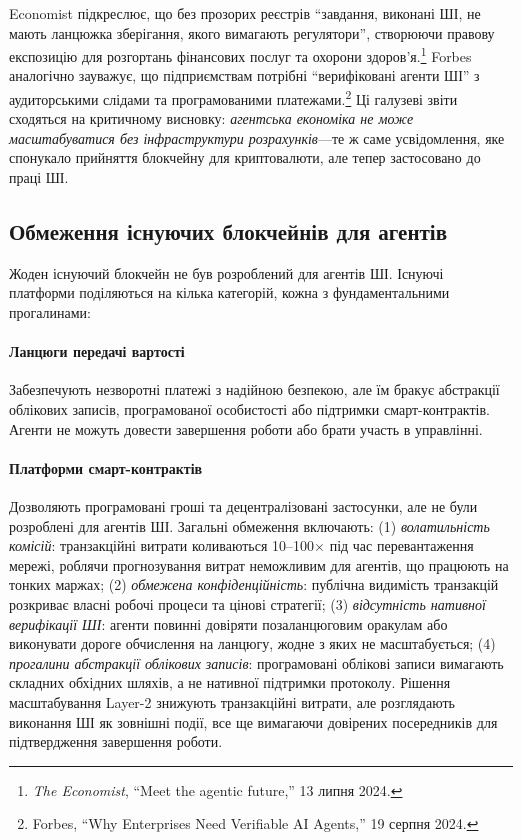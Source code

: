 \documentclass[11pt]{article}
\begin{document}
Economist підкреслює, що без прозорих реєстрів ``завдання, виконані ШІ, не мають ланцюжка зберігання, якого вимагають регулятори'', створюючи правову експозицію для розгортань фінансових послуг та охорони здоров'я.\footnote{\emph{The Economist}, ``Meet the agentic future,'' 13 липня 2024.} Forbes аналогічно зауважує, що підприємствам потрібні ``верифіковані агенти ШІ'' з аудиторськими слідами та програмованими платежами.\footnote{Forbes, ``Why Enterprises Need Verifiable AI Agents,'' 19 серпня 2024.} Ці галузеві звіти сходяться на критичному висновку: \emph{агентська економіка не може масштабуватися без інфраструктури розрахунків}---те ж саме усвідомлення, яке спонукало прийняття блокчейну для криптовалюти, але тепер застосовано до праці ШІ.

\subsection{Обмеження існуючих блокчейнів для агентів}
Жоден існуючий блокчейн не був розроблений для агентів ШІ. Існуючі платформи поділяються на кілька категорій, кожна з фундаментальними прогалинами:

\paragraph{Ланцюги передачі вартості} Забезпечують незворотні платежі з надійною безпекою, але їм бракує абстракції облікових записів, програмованої особистості або підтримки смарт-контрактів. Агенти не можуть довести завершення роботи або брати участь в управлінні.

\paragraph{Платформи смарт-контрактів} Дозволяють програмовані гроші та децентралізовані застосунки, але не були розроблені для агентів ШІ. Загальні обмеження включають: (1) \emph{волатильність комісій}: транзакційні витрати коливаються 10--100$\times$ під час перевантаження мережі, роблячи прогнозування витрат неможливим для агентів, що працюють на тонких маржах; (2) \emph{обмежена конфіденційність}: публічна видимість транзакцій розкриває власні робочі процеси та цінові стратегії; (3) \emph{відсутність нативної верифікації ШІ}: агенти повинні довіряти позаланцюговим оракулам або виконувати дороге обчислення на ланцюгу, жодне з яких не масштабується; (4) \emph{прогалини абстракції облікових записів}: програмовані облікові записи вимагають складних обхідних шляхів, а не нативної підтримки протоколу. Рішення масштабування Layer-2 знижують транзакційні витрати, але розглядають виконання ШІ як зовнішні події, все ще вимагаючи довірених посередників для підтвердження завершення роботи.
\end{document}
